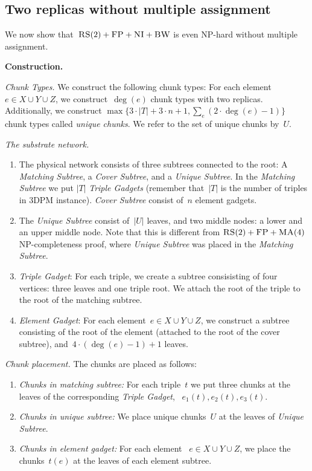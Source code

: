 \documentclass[preprint,12pt]{elsarticle}
\newcommand{\CC}{\textsc{NI}}
\newcommand{\FP}{\textsc{FP}}
\newcommand{\RS}{\textsc{RS}}
\newcommand{\BW}{\textsc{BW}}
\newcommand{\MA}{\textsc{MA}}
\newcommand{\TDPM}{\textsc{3DPM}}
\newcommand{\UnqSubtree}{{{\emph{Unique Subtree}}}}
\newcommand{\MatchSubtree}{{\emph{Matching Subtree}}}
\newcommand{\CoverSubtree}{{\emph{Cover Subtree}}}
\newcommand{\TripleGadget}{{\emph{Triple Gadget}}}
\newcommand{\TripleGadgets}{{\emph{Triple Gadgets}}}
\newcommand{\ElGadget}{{\emph{Element Gadget}}}
\begin{document}
\subsection{Two replicas without multiple assignment}

We now show that~$\RS(2)+\FP+\CC+\BW$ is even NP-hard without multiple
assignment.

\noindent \textbf{Construction.}

\emph{Chunk Types.}  We construct the following chunk types: For each
element~$e\in X\cup Y\cup Z$, we construct~$\deg(e)$ chunk types with
two replicas. Additionally, we construct
$\max\{3\cdot |T| + 3\cdot n + 1, \sum_e(2\cdot \deg(e)-1)\}$
chunk types called \emph{unique chunks}. We
refer to the set of unique chunks by~$U$.

\emph{The substrate network.}

\begin{enumerate}
  \item The physical network consists of three subtrees connected to
  the root: A {\MatchSubtree}, a {\CoverSubtree}, and a
  {\UnqSubtree}. In the {\MatchSubtree} we put $|T|$
  {\TripleGadgets} (remember that~$|T|$ is the number of triples in
  {\TDPM} instance). {\CoverSubtree} consist of~$n$ element gadgets.
  \item The {\UnqSubtree} consist of~$|U|$ leaves, and two middle nodes:
  a lower and an upper middle node. Note that this is different from $\RS(2)+\FP+\MA(4)$ NP-completeness proof, where {\UnqSubtree} was placed in the {\MatchSubtree}.
  \item \TripleGadget: For each triple, we create a subtree
  consisisting of four vertices: three leaves and one triple root.  We
  attach the root of the triple to the root of the matching subtree.
  \item \ElGadget: For each element~$e \in X\cup Y\cup Z$, we
  construct a subtree consisting of the root of the element (attached
  to the root of the cover subtree), and~$4\cdot(\deg(e)-1)+1$ leaves.
\end{enumerate}

\emph{Chunk placement.}
The chunks are placed as follows:
\begin{enumerate}
  \item \emph{Chunks in matching subtree:} For each triple~$t$ we put
  three chunks at the leaves of the corresponding \TripleGadget,
 ~$e_1(t), e_2(t), e_3(t)$.
  \item \emph{Chunks in unique subtree:} We place unique chunks~$U$ at
  the leaves of {\UnqSubtree}.
  \item \emph{Chunks in element gadget:} For each element
 ~$e\in X\cup Y\cup Z$, we place the chunks~$t(e)$ at the leaves of
  each element subtree.
\end{enumerate}
\end{document}
